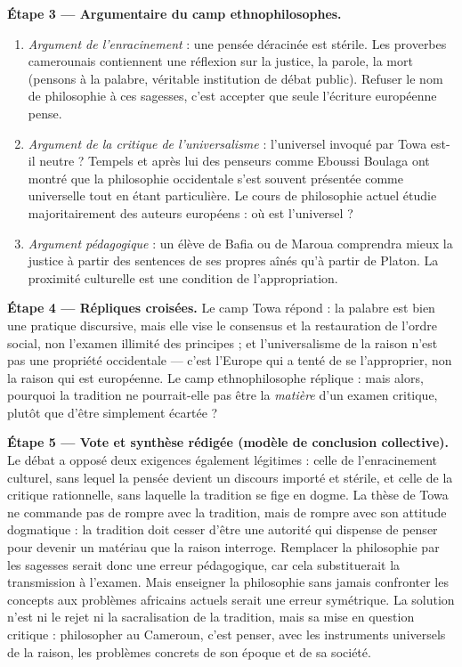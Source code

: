 \documentclass[11pt]{article}
\begin{document}
\begin{exoresolu}
\textbf{Étape 3 — Argumentaire du camp \guillemotleft ethnophilosophes.}
\begin{enumerate}
\item \emph{Argument de l'enracinement} : une pensée déracinée est stérile. Les proverbes camerounais contiennent une réflexion sur la justice, la parole, la mort (pensons à la palabre, véritable institution de débat public). Refuser le nom de philosophie à ces sagesses, c'est accepter que seule l'écriture européenne pense.
\item \emph{Argument de la critique de l'universalisme} : l'\guillemotleft universel \guillemotright invoqué par Towa est-il neutre ? Tempels et après lui des penseurs comme Eboussi Boulaga ont montré que la philosophie occidentale s'est souvent présentée comme universelle tout en étant particulière. Le cours de philosophie actuel étudie majoritairement des auteurs européens : où est l'universel ?
\item \emph{Argument pédagogique} : un élève de Bafia ou de Maroua comprendra mieux la justice à partir des sentences de ses propres aînés qu'à partir de Platon. La proximité culturelle est une condition de l'appropriation.
\end{enumerate}

\textbf{Étape 4 — Répliques croisées.} Le camp Towa répond : la palabre est bien une pratique discursive, mais elle vise le consensus et la restauration de l'ordre social, non l'examen illimité des principes ; et l'universalisme de la raison n'est pas une propriété occidentale — c'est l'Europe qui a tenté de se l'approprier, non la raison qui est européenne. Le camp ethnophilosophe réplique : mais alors, pourquoi la tradition ne pourrait-elle pas être la \emph{matière} d'un examen critique, plutôt que d'être simplement écartée ?

\textbf{Étape 5 — Vote et synthèse rédigée (modèle de conclusion collective).}
\guillemotleft Le débat a opposé deux exigences également légitimes : celle de l'enracinement culturel, sans lequel la pensée devient un discours importé et stérile, et celle de la critique rationnelle, sans laquelle la tradition se fige en dogme. La thèse de Towa ne commande pas de rompre avec la tradition, mais de rompre avec son attitude dogmatique : la tradition doit cesser d'être une autorité qui dispense de penser pour devenir un matériau que la raison interroge. Remplacer la philosophie par les sagesses serait donc une erreur pédagogique, car cela substituerait la transmission à l'examen. Mais enseigner la philosophie sans jamais confronter les concepts aux problèmes africains actuels serait une erreur symétrique. La solution n'est ni le rejet ni la sacralisation de la tradition, mais sa mise en question critique : philosopher au Cameroun, c'est penser, avec les instruments universels de la raison, les problèmes concrets de son époque et de sa société. \guillemotright


\end{exoresolu}
\end{document}
